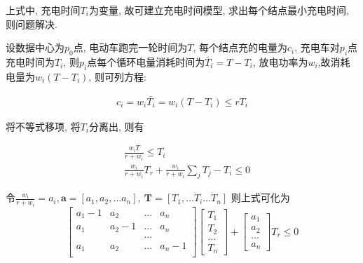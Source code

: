 上式中, 充电时间$T_i$为变量, 故可建立充电时间模型, 求出每个结点最小充电时间, 则问题解决.

设数据中心为$p_0$点, 电动车跑完一轮时间为$T$, 每个结点充的电量为$c_i$, 充电车对$p_i$点充电时间为$T_i$, 则$p_i$点每个循环电量消耗时间为$\bar{T}_i = T-T_i$, 放电功率为$w_i$,故消耗电量为$w_i(T-T_i)$, 则可列方程:

\begin{eqnarray}
c_i = w_i \bar{T_i} = w_i(T-T_i)\leq rT_i 
\end{eqnarray}

将不等式移项, 将$T_i$分离出, 则有

\begin{eqnarray}
\nonumber
\quad &\frac{w_iT}{r+w_i} \leq T_i&\\
\nonumber
\quad &\frac{w_i}{r+w_i} T_{r} + \frac{w_i}{r+w_i} \sum\limits_j T_j - T_i \leq 0&
\end{eqnarray}

令$\frac{w_i}{r+w_i} = a_i, \textbf{a} = [a_1, a_2, \dots a_n], ~\textbf{T} = [T_1,\dots T_i \dots T_n]$
则上式可化为
\begin{equation}       %
    \left[                 %
      \begin{array}{cccc}   %
        a_1-1 & a_2 & \dots& a_n \\  %
        a_1 & a_2 -1 & \dots& a_n \\  %
        &&\dots&\\
        a_1&a_2&\dots&a_n-1\\
      \end{array}
    \right]                 %
    \left[
        \begin{array}{cccc}
         T_1\\
         T_2\\
         ... \\
         T_{n}
        \end{array}
    \right ]
    +
    \left[
    \begin{array}{cccc}
     a_{1}\\
     a_{2}\\
     ... \\
     a_{n}
    \end{array}
    \right ]
    T_r \leq 0
    \end{equation}

  

